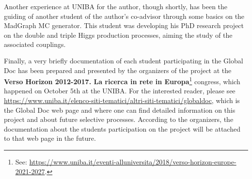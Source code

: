 Another experience at UNIBA for the author, though shortly, has been the guiding of another student of the author's co-advisor through some basics on the MadGraph MC generator. This student was developing his PhD research project on the double and triple Higgs production processes, aiming the study of the associated couplings.

Finally, a very briefly documentation of each student participating in the Global Doc has been prepared and presented by the organizers of the project at the \textbf{Verso Horizon 2012-2017. La ricerca in rete in Europa}\footnote{See:  \url{https://www.uniba.it/eventi-alluniversita/2018/verso-horizon-europe-2021-2027}.} congress, which happened on October 5th at the UNIBA. For the interested reader, please see \url{https://www.uniba.it/elenco-siti-tematici/altri-siti-tematici/globaldoc}, which is the Global Doc web page and where one can find detailed information on this project and about future selective processes. According to the organizers, the documentation about the students participation on the project will be attached to that web page in the future.